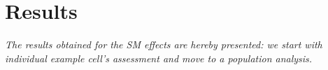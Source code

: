 
\chapter{Results}
\label{cap:Results}

\textit{The results obtained for the SM effects are hereby presented: we start with individual example cell's assessment and move to a population analysis.}


